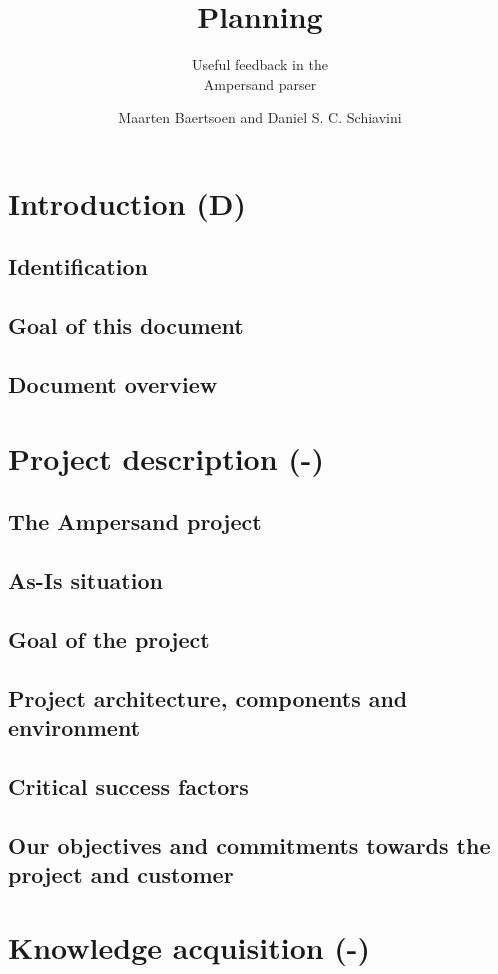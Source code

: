 \documentclass[a4paper,12pt,abstracton,titlepage]{scrartcl}
\author{Maarten Baertsoen and Daniel S. C. Schiavini}
\affil{Open Universiteit Nederland, faculteit Informatica \\
	T61327 - Afstudeerproject bachelor informatica}
\title{Planning}
\subtitle{Useful feedback in the\\ Ampersand parser}
\begin{document}
\maketitle
\newpage

\tableofcontents
\clearpage

\section{Introduction (D)}
\subsection{Identification}
\subsection{Goal of this document}
\subsection{Document overview}

\section{Project description (-)}
\subsection{The Ampersand project}
\subsection{As-Is situation}
\subsection{Goal of the project}
\subsection{Project architecture, components and environment}
\subsection{Critical success factors}
\subsection{Our objectives and commitments towards the project and customer}

\section{Knowledge acquisition (-)}
\end{document}
